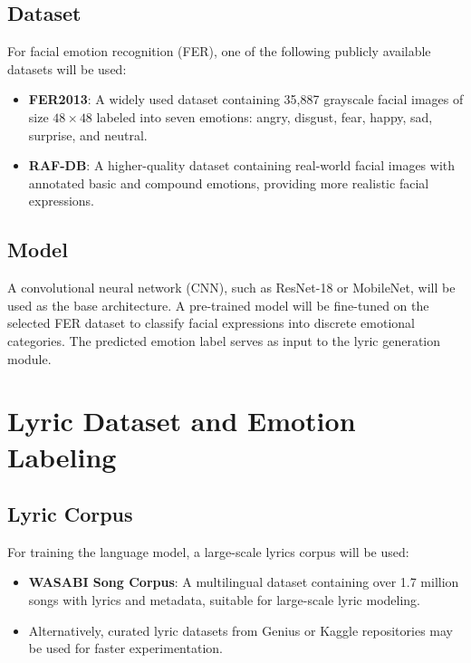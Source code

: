 \documentclass[11pt]{article}
\begin{document}
\subsection{Dataset}

For facial emotion recognition (FER), one of the following publicly available datasets will be used:

\begin{itemize}[leftmargin=*]
    \item \textbf{FER2013}: A widely used dataset containing 35,887 grayscale facial images of size $48 \times 48$ labeled into seven emotions: angry, disgust, fear, happy, sad, surprise, and neutral.
    \item \textbf{RAF-DB}: A higher-quality dataset containing real-world facial images with annotated basic and compound emotions, providing more realistic facial expressions.
\end{itemize}

\subsection{Model}

A convolutional neural network (CNN), such as ResNet-18 or MobileNet, will be used as the base architecture. A pre-trained model will be fine-tuned on the selected FER dataset to classify facial expressions into discrete emotional categories. The predicted emotion label serves as input to the lyric generation module.

\section{Lyric Dataset and Emotion Labeling}

\subsection{Lyric Corpus}

For training the language model, a large-scale lyrics corpus will be used:

\begin{itemize}[leftmargin=*]
    \item \textbf{WASABI Song Corpus}: A multilingual dataset containing over 1.7 million songs with lyrics and metadata, suitable for large-scale lyric modeling.
    \item Alternatively, curated lyric datasets from Genius or Kaggle repositories may be used for faster experimentation.
\end{itemize}
\end{document}
